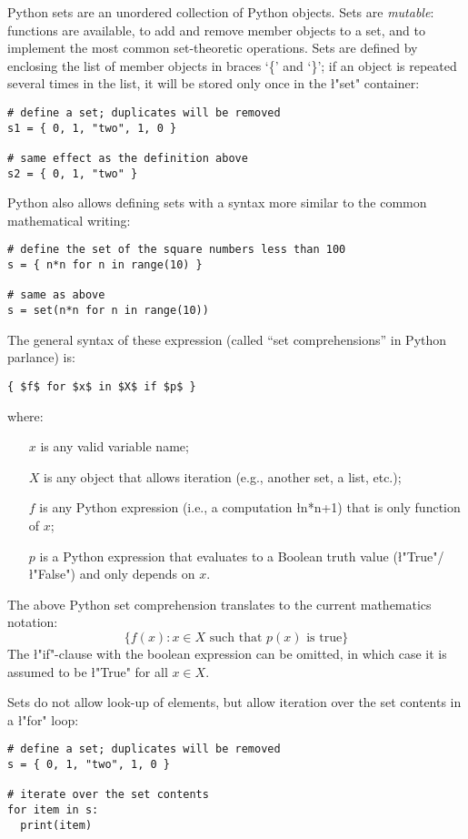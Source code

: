Python sets are an unordered collection of Python objects.  Sets are
\emph{mutable}: functions are available, to add and remove member objects to
a set, and to implement the most common set-theoretic operations.
Sets are defined by enclosing the list of member objects in braces
`\{' and `\}'; if an object is repeated several times in the list,
it will be stored only once in the \l"set" container:
\begin{lstlisting}
# define a set; duplicates will be removed
s1 = { 0, 1, "two", 1, 0 }

# same effect as the definition above
s2 = { 0, 1, "two" }
\end{lstlisting}
Python also allows defining sets with a syntax more similar to the
common mathematical writing:
\begin{lstlisting}
# define the set of the square numbers less than 100
s = { n*n for n in range(10) }

# same as above
s = set(n*n for n in range(10))
\end{lstlisting}
The general syntax of these expression (called ``set comprehensions''
in Python parlance) is:
\begin{lstlisting}
{ $f$ for $x$ in $X$ if $p$ }
\end{lstlisting}
where:
\begin{itemize}
\item[$x$] is any valid variable name;
\item[$X$] is any object that allows iteration (e.g., another
  set, a list, etc.);
\item[$f$] is any Python expression (i.e., a computation \l{n*n+1}) 
  that is only function of $x$;
\item[$p$] is a Python expression that evaluates to a
  Boolean truth value (\l"True"/\l"False") and only depends on $x$.
\end{itemize}
The above Python set comprehension translates to the current
mathematics notation:
\begin{equation*}
  \{ f(x) : x \in X \text{ such that } p(x) \text{ is true} \}
\end{equation*}
The \l"if"-clause with the boolean expression can be omitted, in which
case it is assumed to be \l"True" for all $x \in X$.

Sets do not allow look-up of elements, but allow iteration over the set
contents in a \l"for" loop:
\begin{lstlisting}
# define a set; duplicates will be removed
s = { 0, 1, "two", 1, 0 }

# iterate over the set contents
for item in s:
  print(item)
\end{lstlisting}

